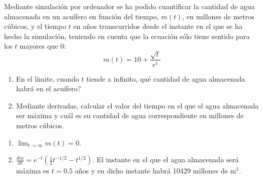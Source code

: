 {Mediante simulación por ordenador se ha podido cuantificar la cantidad de agua almacenada en un acuífero en función del tiempo, $m(t)$, en millones de metros cúbicos, y el tiempo $t$ en años transcurridos desde el instante en el que se ha hecho la simulación, teniendo en cuenta que la ecuación sólo tiene sentido para los $t$ mayores que 0:
\[
m(t) = 10 + \frac{{\sqrt t }} {{e^t }}
\]
\begin{enumerate}
\item En el límite, cuando $t$ tiende a infinito, qué cantidad de agua almacenada habrá en el acuífero?
\item Mediante derivadas, calcular el valor del tiempo en el que el agua almacenada ser máxima y cuál es su cantidad de agua correspondiente en millones de metros cúbicos.
\end{enumerate}
}
{\begin{enumerate}
\item $\lim_{t\rightarrow \infty}m(t) = 0$.
\item $\frac{dm}{dt}=e^{-t}(\frac{1}{2}t^{-1/2}-t^{1/2})$. El instante en el que el agua almacenada será máxima es $t=0.5$ años y en dicho instante habrá 10429 millones de m$^3$.  
\end{enumerate}
}
{
}


